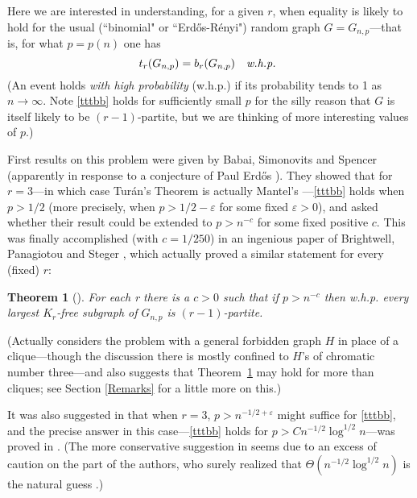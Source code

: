 \documentclass[letterpaper,11pt]{article}
\newtheorem{thm}{Theorem}[section]
\newcommand{\beq}[1]{\begin{equation}\label{#1}}
\newcommand{\enq}[0]{\end{equation}}
\newcommand{\nin}[0]{\noindent}
\newcommand{\ra}[0]{\rightarrow}
\newcommand{\bb}[0]{b}
\newcommand{\ttt}[0]{t}
\newcommand{\0}[0]{\emptyset}
\newcommand{\eps}[0]{\varepsilon }
\begin{document}
Here we are interested in understanding, for a given $r$,
when
equality is likely
to hold for the usual (``binomial" or ``Erd\H{o}s-R\'enyi") random graph
$G=G_{n,p}$---that is, for what $p=p(n)$
one has
\beq{tttbb}
\ttt_r(G_{n,p})=\bb_r(G_{n,p}) ~~~\mbox{{\em w.h.p.} }
\enq
(An event holds {\em with high probability}
(w.h.p.) if its probability tends to 1 as $n\ra\infty$.
Note \eqref{tttbb}
holds for sufficiently small $p$ for the silly reason
that $G$ is itself likely to be $(r-1)$-partite, but we are
thinking of more interesting values of $p$.)



First results on this problem were given by
Babai, Simonovits and Spencer \cite{BSS}
(apparently in response to a conjecture of Paul Erd\H{o}s
\cite{Pach}).
They showed that
for $r=3$---in which case Tur\'an's Theorem is actually
Mantel's \cite{Mantel}---\eqref{tttbb} holds when
$p>1/2$
(more precisely, when $p>1/2-\eps$ for some
fixed $\eps >0$),
and asked whether their result could be extended to $p > n^{-c}$
for some fixed positive $c$.
This was finally accomplished (with $c = 1/250$)
in an ingenious paper of
Brightwell, Panagiotou and Steger \cite{BPS},
which actually proved a similar statement for every (fixed)
$r$:
\begin{thm}[\cite{BPS}]\label{Tbps}
For each r there is a $c>0$ such that if $p> n^{-c}$
then w.h.p. every largest
$K_r$-free subgraph of $G_{n,p}$ is
$(r-1)$-partite.
\end{thm}

\nin
(Actually \cite{BSS} considers the problem with a
general forbidden graph $H$ in place of a clique---though
the discussion there is mostly
confined to $H$'s of chromatic number three---and
\cite{BPS} also suggests that
Theorem~\ref{Tbps} may hold for more than cliques;
see Section \ref{Remarks} for a little more on this.)











\medskip
It was also suggested in \cite{BPS} that when $r=3$,
$p> n^{-1/2+\eps}$ might suffice for \eqref{tttbb}, and
the precise answer in this case---\eqref{tttbb} holds for
$p>Cn^{-1/2}\log^{1/2} n$---was proved in
\cite{DKMantel}.
(The more conservative suggestion in \cite{BPS} seems due
to an excess of caution on the part of the authors,
who surely realized that $\Theta (n^{-1/2}\log^{1/2} n)$
is the natural guess \cite{StegerPC}.)
\end{document}
